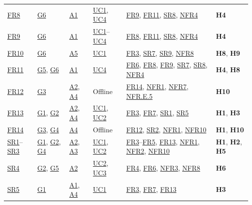 \documentclass[11pt]{article}
\begin{document}
{\begin{tabularx}{\textwidth}{P{1.15cm} P{1.45cm} P{1.45cm} P{1.55cm} Y P{2.1cm}}
\hyperref[FR8]{FR8} & \hyperref[G6]{G6} & \hyperref[A1]{A1} & \hyperref[UC1]{UC1}, \hyperref[UC4]{UC4} & \hyperref[FR9]{FR9}, \hyperref[FR11]{FR11}, \hyperref[SR8]{SR8}, \hyperref[NFR4]{NFR4} & \textbf{H4}\\
\hyperref[FR9]{FR9} & \hyperref[G6]{G6} & \hyperref[A1]{A1} & \hyperref[UC1]{UC1}--\hyperref[UC4]{UC4} & \hyperref[FR8]{FR8}, \hyperref[FR11]{FR11}, \hyperref[SR8]{SR8}, \hyperref[NFR4]{NFR4} & \textbf{H4}\\
\hyperref[FR10]{FR10} & \hyperref[G6]{G6} & \hyperref[A5]{A5} & \hyperref[UC1]{UC1} & \hyperref[FR3]{FR3}, \hyperref[SR7]{SR7}, \hyperref[SR9]{SR9}, \hyperref[NFR8]{NFR8} & \textbf{H8}, \textbf{H9}\\
\hyperref[FR11]{FR11} & \hyperref[G5]{G5}, \hyperref[G6]{G6} & \hyperref[A1]{A1} & \hyperref[UC4]{UC4} & \hyperref[FR6]{FR6}, \hyperref[FR8]{FR8}, \hyperref[FR9]{FR9}, \hyperref[SR7]{SR7}, \hyperref[SR8]{SR8}, \hyperref[NFR4]{NFR4} & \textbf{H4}, \textbf{H8}\\
\hyperref[FR12]{FR12} & \hyperref[G3]{G3} & \hyperref[A2]{A2}, \hyperref[A4]{A4} & Offline & \hyperref[FR14]{FR14}, \hyperref[NFR1]{NFR1}, \hyperref[NFR7]{NFR7}, \hyperref[NFR.E.5]{NFR.E.5} & \textbf{H10}\\
\hyperref[FR13]{FR13} & \hyperref[G1]{G1}, \hyperref[G2]{G2} & \hyperref[A2]{A2}, \hyperref[A4]{A4} & \hyperref[UC1]{UC1}, \hyperref[UC2]{UC2} & \hyperref[FR3]{FR3}, \hyperref[FR7]{FR7}, \hyperref[SR1]{SR1}, \hyperref[SR5]{SR5} & \textbf{H1}, \textbf{H3}\\
\hyperref[FR14]{FR14} & \hyperref[G3]{G3}, \hyperref[G4]{G4} & \hyperref[A4]{A4} & Offline & \hyperref[FR12]{FR12}, \hyperref[SR2]{SR2}, \hyperref[NFR1]{NFR1}, \hyperref[NFR10]{NFR10} & \textbf{H1}, \textbf{H10}\\
\midrule
\hyperref[SR1]{SR1}--\hyperref[SR3]{SR3} & \hyperref[G1]{G1}, \hyperref[G2]{G2}, \hyperref[G4]{G4} & \hyperref[A2]{A2}, \hyperref[A3]{A3} & \hyperref[UC1]{UC1}, \hyperref[UC2]{UC2} & \hyperref[FR3]{FR3}--\hyperref[FR5]{FR5}, \hyperref[FR13]{FR13}, \hyperref[NFR1]{NFR1}, \hyperref[NFR2]{NFR2}, \hyperref[NFR10]{NFR10} & \textbf{H1}, \textbf{H2}, \textbf{H5}\\
\hyperref[SR4]{SR4} & \hyperref[G2]{G2}, \hyperref[G5]{G5} & \hyperref[A2]{A2} & \hyperref[UC2]{UC2}, \hyperref[UC3]{UC3} & \hyperref[FR4]{FR4}, \hyperref[FR6]{FR6}, \hyperref[NFR3]{NFR3}, \hyperref[NFR8]{NFR8} & \textbf{H6}\\
\hyperref[SR5]{SR5} & \hyperref[G1]{G1} & \hyperref[A1]{A1}, \hyperref[A4]{A4} & \hyperref[UC1]{UC1} & \hyperref[FR3]{FR3}, \hyperref[FR7]{FR7}, \hyperref[FR13]{FR13} & \textbf{H3}\\

\end{tabularx}}
\end{document}
